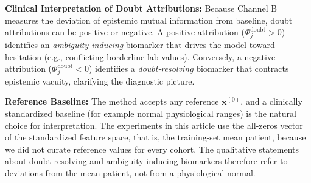 \documentclass[3p,12pt]{elsarticle}
\theoremstyle{plain}
\theoremstyle{definition}
\begin{document}
\noindent \textbf{Clinical Interpretation of Doubt Attributions:} Because Channel B measures the deviation of epistemic mutual information from baseline, doubt attributions can be positive or negative. A positive attribution ($\Phi_j^{\text{doubt}} > 0$) identifies an \emph{ambiguity-inducing} biomarker that drives the model toward hesitation (e.g., conflicting borderline lab values). Conversely, a negative attribution ($\Phi_j^{\text{doubt}} < 0$) identifies a \emph{doubt-resolving} biomarker that contracts epistemic vacuity, clarifying the diagnostic picture.

\noindent \textbf{Reference Baseline:} The method accepts any reference $\mathbf{x}^{(0)}$, and a clinically standardized baseline (for example normal physiological ranges) is the natural choice for interpretation. The experiments in this article use the all-zeros vector of the standardized feature space, that is, the training-set mean patient, because we did not curate reference values for every cohort. The qualitative statements about doubt-resolving and ambiguity-inducing biomarkers therefore refer to deviations from the mean patient, not from a physiological normal.
\end{document}
